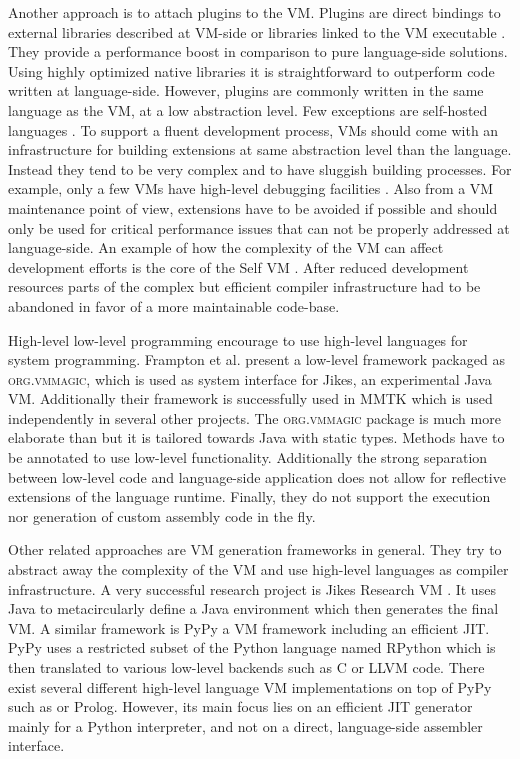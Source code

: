Another approach is to attach plugins to the VM.
Plugins are direct bindings to external libraries described at VM-side or libraries linked to the VM executable \cite[Ch.\ 5]{Blac09a}. 
They provide a performance boost in comparison to pure language-side solutions.
Using highly optimized native libraries it is straightforward to outperform code written at language-side.
However, plugins are commonly written in the same language as the VM, at a low abstraction level.
Few exceptions are self-hosted languages \cite{Unga05a,Wimm13a,Rigo06a}.
To support a fluent development process, VMs should come with an infrastructure for building extensions at same abstraction level than the language.
Instead they tend to be very complex and to have sluggish building processes. For example, only a few VMs have high-level debugging facilities \cite{Inga97a,Unga05a,Wimm13a}.
Also from a VM maintenance point of view, extensions have to be avoided if possible and should only be used for critical performance issues that can not be properly addressed at language-side.
An example of how the complexity of the VM can affect development efforts is the core of the Self VM \cite{Unga07a}.
After reduced development resources parts of the complex but efficient compiler infrastructure had to be abandoned in favor of a more maintainable code-base.

High-level low-level programming \cite{Fram09a} encourage to use high-level languages for system programming.
Frampton et al. present a low-level framework packaged as \textsc{org.vmmagic}, which is used as system interface for Jikes, an experimental Java VM.
Additionally their framework is successfully used in MMTK \cite{Blac04a} which is used independently in several other projects.
The \textsc{org.vmmagic} package is much more elaborate than \B but it is tailored towards Java with static types.
Methods have to be annotated to use low-level functionality.
Additionally the strong separation between low-level code and language-side application does not allow for reflective extensions of the language runtime.
Finally, they do not support the execution nor generation of custom assembly code in the fly.

Other related approaches are VM generation frameworks in general.
They try to abstract away the complexity of the VM and use high-level languages as compiler infrastructure.
A very successful research project is Jikes Research VM \cite{Jikes}.
It uses Java to metacircularly define a Java environment which then generates the final VM.
A similar framework is PyPy \cite{Rigo06a} a VM framework including an efficient JIT. 
PyPy uses a restricted subset of the Python language named RPython which is then translated to various low-level backends such as C or LLVM code.
There exist several different high-level language VM implementations on top of PyPy such as \ST \cite{Bolz08a} or Prolog.
However, its main focus lies on an efficient JIT generator mainly for a Python interpreter, and not on a direct, language-side assembler interface.


